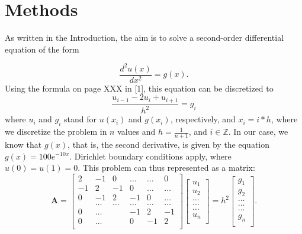 \documentclass[10pt,a4paper]{article}
\begin{document}
\section{Methods}

As written in the Introduction, the aim is to solve a second-order differential equation of the form

\begin{equation*}
\frac{d^2u(x)}{dx^2} = g(x).

\end{equation*}
Using the formula on page XXX in [1], this equation can be discretized to 
\begin{equation*}
\frac{u_{i-1}-2u_{i}+u_{i+1}}{h^2} = g_{i}
\end{equation*}
where $u_{i}$ and $g_{i}$ stand for $u(x_{i})$ and $g(x_{i})$, respectively, and $x_{i}=i*h$, where we discretize the problem in $n$ values and  $h=\frac{1}{n+1}$, and $i  \in  \mathbb{Z}$.
In our case, we know that $g(x)$, that is, the second derivative, is given by the equation $g(x) = 100e^{-10x}$. Dirichlet boundary conditions apply, where $u(0)=u(1)=0$.
This problem can thus represented as a matrix:
\[
    \mathbf{A} = \begin{bmatrix}
                           2& -1& 0 &\dots   & \dots &0 \\
                           -1 & 2 & -1 &0 &\dots &\dots \\
                           0&-1 &2 & -1 & 0 & \dots \\
                           & \dots   & \dots &\dots   &\dots & \dots \\
                           0&\dots   &  &-1 &2& -1 \\
                           0&\dots    &  & 0  &-1 & 2 \\
                      \end{bmatrix}\begin{bmatrix}
                           u_1\\
                           u_2\\
                           \dots \\
                          \dots  \\
                          \dots \\
                           u_n\\
                      \end{bmatrix}
  =h^2
\begin{bmatrix}
                           {g}_1\\
                           {g}_2\\
                           \dots \\
                           \dots \\
                          \dots \\
                           {g}_n\\
                      \end{bmatrix}.
\]
\end{document}
